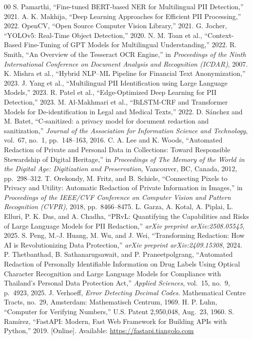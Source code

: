 \documentclass[conference]{IEEEtran}
\begin{document}
\begin{thebibliography}{00}
 S. Pamarthi, ``Fine-tuned BERT-based NER for Multilingual PII Detection,'' 2021.
 A. K. Makhija, ``Deep Learning Approaches for Efficient PII Processing,'' 2022.
 OpenCV, ``Open Source Computer Vision Library,'' 2021.
 G. Jocher, ``YOLOv5: Real-Time Object Detection,'' 2020.
 N. M. Toan et al., ``Context-Based Fine-Tuning of GPT Models for Multilingual Understanding,'' 2022.
 R. Smith, ``An Overview of the Tesseract OCR Engine,'' in \textit{Proceedings of the Ninth International Conference on Document Analysis and Recognition (ICDAR)}, 2007.
 K. Mishra et al., ``Hybrid NLP--ML Pipeline for Financial Text Anonymization,'' 2023.
 J. Yang et al., ``Multilingual PII Identification using Large Language Models,'' 2023.
 R. Patel et al., ``Edge-Optimized Deep Learning for PII Detection,'' 2023.
 M. Al-Makhmari et al., ``BiLSTM-CRF and Transformer Models for De-identification in Legal and Medical Texts,'' 2022.
 D. S\'{a}nchez and M. Batet, ``C-sanitized: a privacy model for document redaction and sanitization,'' \textit{Journal of the Association for Information Science and Technology}, vol.~67, no.~1, pp.~148--163, 2016.
 C. A. Lee and K. Woods, ``Automated Redaction of Private and Personal Data in Collections: Toward Responsible Stewardship of Digital Heritage,'' in \textit{Proceedings of The Memory of the World in the Digital Age: Digitization and Preservation}, Vancouver, BC, Canada, 2012, pp.~298--312.
 T. Orekondy, M. Fritz, and B. Schiele, ``Connecting Pixels to Privacy and Utility: Automatic Redaction of Private Information in Images,'' in \textit{Proceedings of the IEEE/CVF Conference on Computer Vision and Pattern Recognition (CVPR)}, 2018, pp.~8466--8475.
 L. Garza, A. Kotal, A. Piplai, L. Elluri, P. K. Das, and A. Chadha, ``PRvL: Quantifying the Capabilities and Risks of Large Language Models for PII Redaction,'' \textit{arXiv preprint arXiv:2508.05545}, 2025.
 S. Peng, M.-J. Huang, M. Wu, and J. Wei, ``Transforming Redaction: How AI is Revolutionizing Data Protection,'' \textit{arXiv preprint arXiv:2409.15308}, 2024.
 P. Thetbanthad, B. Sathanarugsawait, and P. Praneetpolgrang, ``Automated Redaction of Personally Identifiable Information on Drug Labels Using Optical Character Recognition and Large Language Models for Compliance with Thailand's Personal Data Protection Act,'' \textit{Applied Sciences}, vol.~15, no.~9, p.~4923, 2025.
 J. Verhoeff, \textit{Error Detecting Decimal Codes}. Mathematical Centre Tracts, no.~29, Amsterdam: Mathematisch Centrum, 1969.
 H. P. Luhn, ``Computer for Verifying Numbers,'' U.S. Patent 2,950,048, Aug.~23, 1960.
 S. Ram\'{i}rez, ``FastAPI: Modern, Fast Web Framework for Building APIs with Python,'' 2019. [Online]. Available: \url{https://fastapi.tiangolo.com}
\end{thebibliography}
\end{document}
